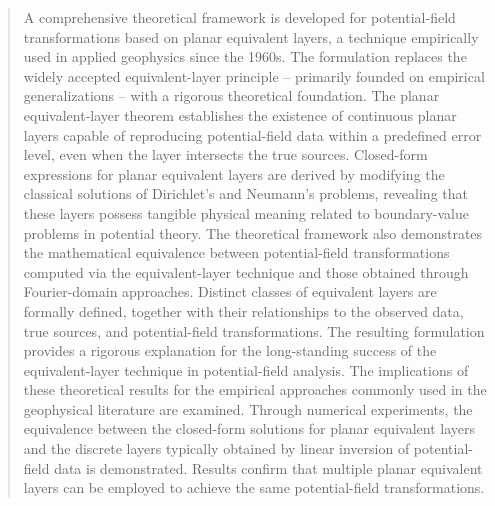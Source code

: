 \begin{abstract}
	A comprehensive theoretical framework is developed for potential-field transformations 
	based on planar equivalent layers, a technique empirically used in applied geophysics since 
	the 1960s. The formulation replaces the widely accepted equivalent-layer principle -- primarily 
	founded on empirical generalizations -- with a rigorous theoretical foundation. The planar 
	equivalent-layer theorem establishes the existence of continuous planar layers capable of 
	reproducing potential-field data within a predefined error level, even when the layer 
	intersects the true sources. Closed-form expressions for planar equivalent layers are derived 
	by modifying the classical solutions of Dirichlet’s and Neumann’s problems, revealing that 
	these layers possess tangible physical meaning related to boundary-value problems in potential 
	theory. The theoretical framework also demonstrates the mathematical equivalence between 
	potential-field transformations computed via the equivalent-layer technique and those obtained 
	through Fourier-domain approaches. Distinct classes of equivalent layers are formally defined, 
	together with their relationships to the observed data, true sources, and potential-field 
	transformations. The resulting formulation provides a rigorous explanation for the 
	long-standing success of the equivalent-layer technique in potential-field analysis.
	The implications of these theoretical results for the empirical 
	approaches commonly used in the geophysical literature are examined. Through 
	numerical experiments, the equivalence between the closed-form solutions for planar 
	equivalent layers and the discrete layers typically obtained by linear inversion of 
	potential-field data is demonstrated. Results confirm that multiple planar equivalent 
	layers can be employed to achieve the same potential-field transformations.
\end{abstract}
